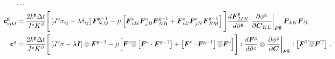 \documentclass[10pt,letterpaper,oneside]{report}
\newcommand{\ten}[1]{\mbox{\boldmath $#1$}{}}
\newcommand{\tenf}[1]{\mbox{{\sffamily{\bfseries {#1}}}}}
\newcommand{\scas}[1]{\mbox{{\scriptsize{${\rm{#1}}$}}}{}}
\newcommand{\tens}[1]{\mbox{\boldmath{\scriptsize{$#1$}}}{}}
\begin{document}
\begin{align}
\cdots{}& \notag \\
\tenf{c}^{\scas{g}}_{ijkl} ={}& \frac{2 k^{\scas{g}} \Delta t}{ J^{\scas{e}} K^\vartheta } \Bigg[ \left[ J^{\scas{e}} \sigma_{ij} - \lambda \delta_{ij} \right] \ten{F}^{\scas{g}-1}_{NM} - \mu \left[ \ten{F}^{\scas{e}}_{iM} \ten{F}^{\scas{e}}_{jB} \ten{F}^{\scas{g}-1}_{NB} + \ten{F}^{\scas{e}}_{iB} \ten{F}^{\scas{e}}_{jN} \ten{F}^{\scas{g}-1}_{BM} \right] \Bigg] 
\frac{d \ten{F}^{\scas{g}}_{MN}}{d \vartheta^{\scas{g}}} \left. \frac{\partial \phi^{\scas{g}} }{\partial \ten{C}_{KL}} \right|_{\tens{F}^{\scas{g}}} \ten{F}_{kK} \ten{F}_{lL} 
\label{neohook_growth_tangent}
\\
\tenf{c}^{\scas{g}} ={}& \frac{2 k^{\scas{g}} \Delta t}{ J^{\scas{e}} K^\vartheta } \Bigg[ \left[ J^{\scas{e}} \sigma - \lambda \ten{I} \right] \otimes \ten{F}^{\scas{g}-1} - \mu \Big[ \ten{F}^{\scas{e}} \overline{\otimes} \left[ \ten{F}^{\scas{e}} \cdot \ten{F}^{\scas{g}-1} \right] + \left[ \ten{F}^{\scas{e}} \cdot \ten{F}^{\scas{g}-1} \right] \overline{\otimes} \ten{F}^{\scas{e}} \Big] \Bigg] : \frac{ d \ten{F}^{\scas{g}} }{ d \vartheta^{\scas{g}} } \otimes \left. \frac{ \partial \phi^{\scas{g}} }{ \partial \ten{C} } \right|_{\tens{F}^{\scas{g}}} : \left[ \ten{F}^{\scas{T}} \overline{\otimes} \ten{F}^{\scas{T}} \right] \, .
\notag 
\end{align}
\end{document}
